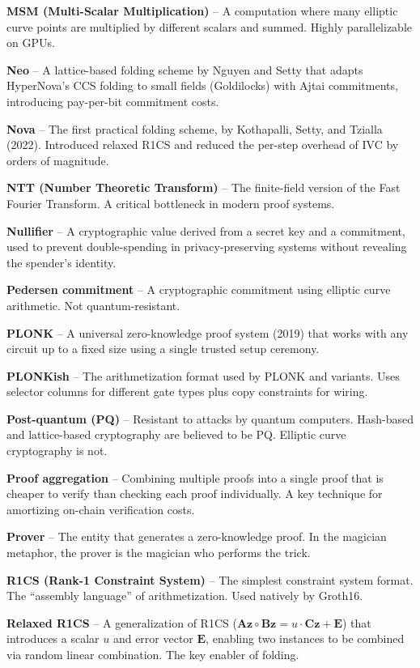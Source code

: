 \documentclass[
  11pt,
  openany]{report}
\renewcommand{\textbf}[1]{{\bfseries\color{MidnightBold}#1}}
\begin{document}
\textbf{MSM (Multi-Scalar Multiplication)} -- A computation where many elliptic
curve points are multiplied by different scalars and summed. Highly
parallelizable on GPUs.

\textbf{Neo} -- A lattice-based folding scheme by Nguyen and Setty that adapts
HyperNova's CCS folding to small fields (Goldilocks) with Ajtai commitments,
introducing pay-per-bit commitment costs.

\textbf{Nova} -- The first practical folding scheme, by Kothapalli, Setty, and
Tzialla (2022). Introduced relaxed R1CS and reduced the per-step overhead of IVC
by orders of magnitude.

\textbf{NTT (Number Theoretic Transform)} -- The finite-field version of the
Fast Fourier Transform. A critical bottleneck in modern proof systems.

\textbf{Nullifier} -- A cryptographic value derived from a secret key and a
commitment, used to prevent double-spending in privacy-preserving systems
without revealing the spender's identity.

\textbf{Pedersen commitment} -- A cryptographic commitment using elliptic curve
arithmetic. Not quantum-resistant.

\textbf{PLONK} -- A universal zero-knowledge proof system (2019) that works with
any circuit up to a fixed size using a single trusted setup ceremony.

\textbf{PLONKish} -- The arithmetization format used by PLONK and variants. Uses
selector columns for different gate types plus copy constraints for wiring.

\textbf{Post-quantum (PQ)} -- Resistant to attacks by quantum computers.
Hash-based and lattice-based cryptography are believed to be PQ. Elliptic curve
cryptography is not.

\textbf{Proof aggregation} -- Combining multiple proofs into a single proof that
is cheaper to verify than checking each proof individually. A key technique for
amortizing on-chain verification costs.

\textbf{Prover} -- The entity that generates a zero-knowledge proof. In the
magician metaphor, the prover is the magician who performs the trick.

\textbf{R1CS (Rank-1 Constraint System)} -- The simplest constraint system
format. The ``assembly language'' of arithmetization. Used natively by Groth16.

\textbf{Relaxed R1CS} -- A generalization of R1CS
(\(\mathbf{A}\mathbf{z} \circ \mathbf{B}\mathbf{z} = u \cdot \mathbf{C}\mathbf{z} + \mathbf{E}\))
that introduces a scalar \(u\) and error vector \(\mathbf{E}\), enabling two
instances to be combined via random linear combination. The key enabler of
folding.
\end{document}

